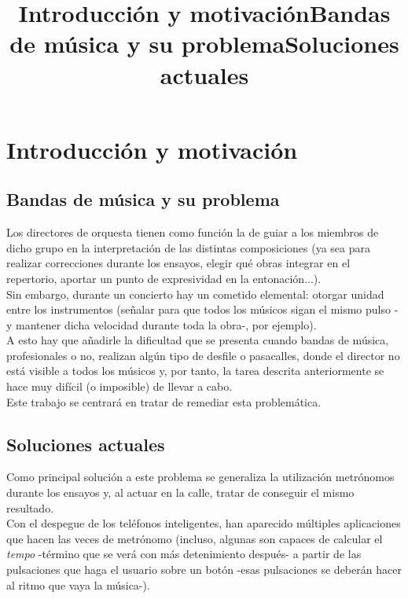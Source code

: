\chapter{Introducción y motivación}
\title{Introducción y motivación}
\title{Bandas de música y su problema}
\section{Bandas de música y su problema}

Los directores de orquesta tienen como función la de guiar a los miembros de dicho
grupo en la interpretación de las distintas composiciones (ya sea para realizar correcciones
durante los ensayos, elegir qué obras integrar en el repertorio, aportar un punto de expresividad
en la entonación...).\\

Sin embargo, durante un concierto hay un cometido elemental: otorgar unidad entre los instrumentos
(señalar para que todos los músicos sigan el mismo pulso -y mantener dicha velocidad durante toda la
obra-, por ejemplo).\\

A esto hay que añadirle la dificultad que se presenta cuando bandas de música, profesionales o no,
realizan algún tipo de desfile o pasacalles, donde el director no está visible a todos los músicos y,
por tanto, la tarea descrita anteriormente se hace muy difícil (o imposible) de llevar a cabo.\\

Este trabajo se centrará en tratar de remediar esta problemática.


\title{Soluciones actuales}
\section{Soluciones actuales}

Como principal solución a este problema se generaliza la utilización metrónomos durante los ensayos y,
al actuar en la calle, tratar de conseguir el mismo resultado.\\

Con el despegue de los teléfonos inteligentes, han aparecido múltiples aplicaciones que hacen las veces
de metrónomo (incluso, algunas son capaces de calcular el \textit{tempo} -término que se verá con más detenimiento
después- a partir de las pulsaciones que haga el usuario sobre un botón -esas pulsaciones se deberán hacer
al ritmo que vaya la música-).\\


